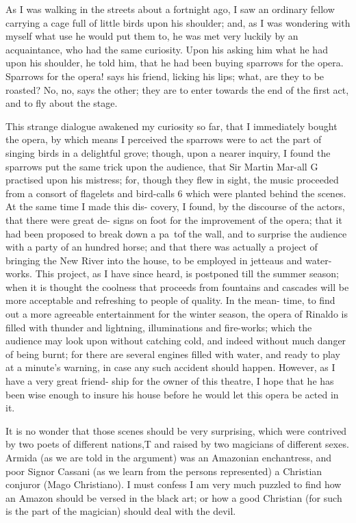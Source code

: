 As I was walking in the streets about a fortnight ago, I saw an ordinary fellow carrying a cage full of little birds upon his shoulder; and, as I was wondering with myself what use he would put them to, he was met very luckily by an acquaintance, who had the same curiosity. Upon his asking him what he had upon his shoulder, he told him, that he had been buying sparrows for the opera. Sparrows for the opera! says his friend, licking his lips; what, are they to be roasted? No, no, says the other; they are to enter towards the end of the first act, and to fly about the stage.

This strange dialogue awakened my curiosity so far, that I immediately bought the opera, by which means I perceived the sparrows were to act the part of singing birds in a delightful grove; though, upon a nearer inquiry, I found the sparrows put the same trick upon the audience, that Sir Martin Mar-all G practised upon his mistress; for, though they flew in sight, the music proceeded from a consort of flagelets and bird-calls 6 which were planted behind the scenes. At the same time I made this dis- covery, I found, by the discourse of the actors, that there were great de- signs on foot for the improvement of the opera; that it had been proposed to break down a pa~tof the wall, and to surprise the audience with a party of an hundred horse; and that there was actually a project of bringing the New River into the house, to be employed in jetteaus and water-works. This project, as I have since heard, is postponed till the summer season; when it is thought the coolness that proceeds from fountains and cascades will be more acceptable and refreshing to people of quality. In the mean- time, to find out a more agreeable entertainment for the winter season, the opera of Rinaldo is filled with thunder and lightning, illuminations and fire-works; which the audience may look upon without catching cold, and indeed without much danger of being burnt; for there are several engines filled with water, and ready to play at a minute's warning, in case any such accident should happen. However, as I have a very great friend- ship for the owner of this theatre, I hope that he has been wise enough to insure his house before he would let this opera be acted in it.

It is no wonder that those scenes should be very surprising, which were contrived by two poets of different nations,T and raised by two magicians of different sexes. Armida (as we are told in the argument) was an Amazonian enchantress, and poor Signor Cassani (as we learn from the persons represented) a Christian conjuror (Mago Christiano). I must confess I am very much puzzled to find how an Amazon should be versed in the black art; or how a good Christian (for such is the part of the magician) should deal with the devil.

